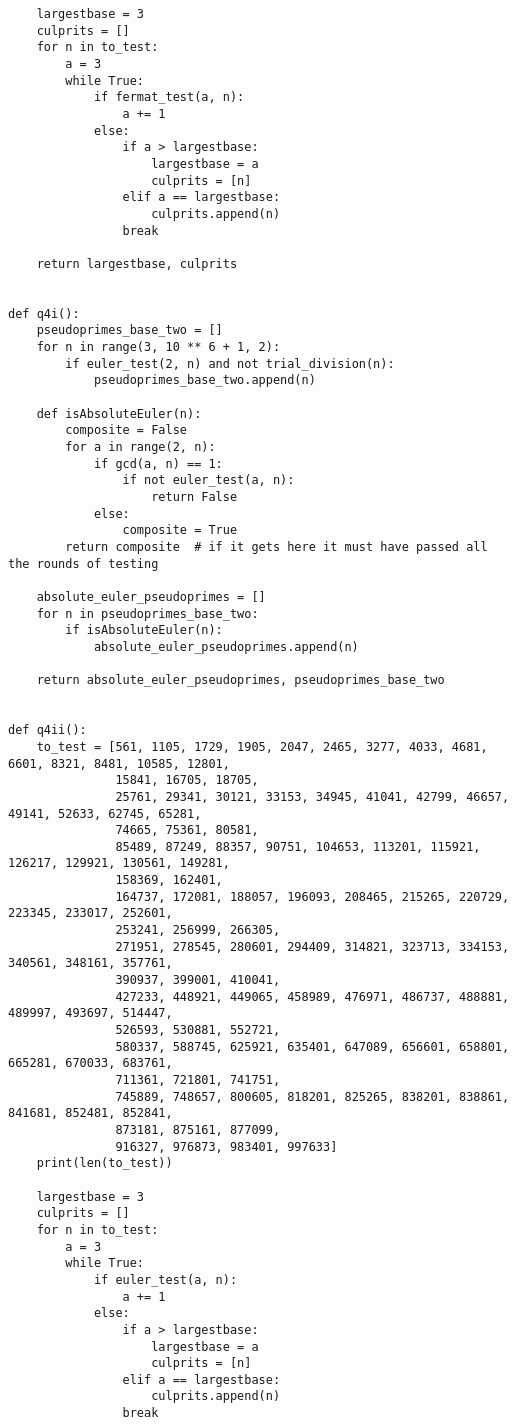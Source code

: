 \documentclass[10pt,a4paper]{report}
\begin{document}
\begin{verbatim}
    largestbase = 3
    culprits = []
    for n in to_test:
        a = 3
        while True:
            if fermat_test(a, n):
                a += 1
            else:
                if a > largestbase:
                    largestbase = a
                    culprits = [n]
                elif a == largestbase:
                    culprits.append(n)
                break

    return largestbase, culprits


def q4i():
    pseudoprimes_base_two = []
    for n in range(3, 10 ** 6 + 1, 2):
        if euler_test(2, n) and not trial_division(n):
            pseudoprimes_base_two.append(n)

    def isAbsoluteEuler(n):
        composite = False
        for a in range(2, n):
            if gcd(a, n) == 1:
                if not euler_test(a, n):
                    return False
            else:
                composite = True
        return composite  # if it gets here it must have passed all the rounds of testing

    absolute_euler_pseudoprimes = []
    for n in pseudoprimes_base_two:
        if isAbsoluteEuler(n):
            absolute_euler_pseudoprimes.append(n)

    return absolute_euler_pseudoprimes, pseudoprimes_base_two


def q4ii():
    to_test = [561, 1105, 1729, 1905, 2047, 2465, 3277, 4033, 4681, 6601, 8321, 8481, 10585, 12801,
               15841, 16705, 18705,
               25761, 29341, 30121, 33153, 34945, 41041, 42799, 46657, 49141, 52633, 62745, 65281,
               74665, 75361, 80581,
               85489, 87249, 88357, 90751, 104653, 113201, 115921, 126217, 129921, 130561, 149281,
               158369, 162401,
               164737, 172081, 188057, 196093, 208465, 215265, 220729, 223345, 233017, 252601,
               253241, 256999, 266305,
               271951, 278545, 280601, 294409, 314821, 323713, 334153, 340561, 348161, 357761,
               390937, 399001, 410041,
               427233, 448921, 449065, 458989, 476971, 486737, 488881, 489997, 493697, 514447,
               526593, 530881, 552721,
               580337, 588745, 625921, 635401, 647089, 656601, 658801, 665281, 670033, 683761,
               711361, 721801, 741751,
               745889, 748657, 800605, 818201, 825265, 838201, 838861, 841681, 852481, 852841,
               873181, 875161, 877099,
               916327, 976873, 983401, 997633]
    print(len(to_test))

    largestbase = 3
    culprits = []
    for n in to_test:
        a = 3
        while True:
            if euler_test(a, n):
                a += 1
            else:
                if a > largestbase:
                    largestbase = a
                    culprits = [n]
                elif a == largestbase:
                    culprits.append(n)
                break


\end{verbatim}
\end{document}
